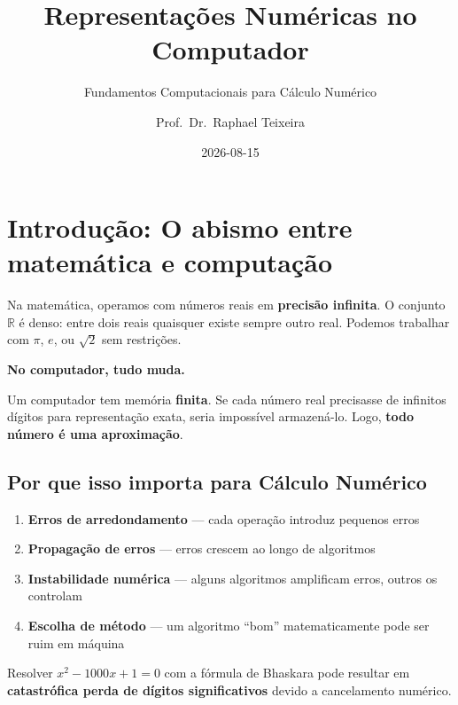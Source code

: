 \documentclass[
  11pt,
  letterpaper,
  DIV=11,
  numbers=noendperiod]{scrartcl}
\title{Representações Numéricas no Computador}
\subtitle{Fundamentos Computacionais para Cálculo Numérico}
\author{Prof.~Dr.~Raphael Teixeira}
\date{2026-08-15}
\providecommand{\tightlist}{%
  \setlength{\itemsep}{0pt}\setlength{\parskip}{0pt}}
\renewcommand*\contentsname{Table of contents}
\newcommand\contentsname{Table of contents}
\begin{document}
\maketitle

\renewcommand*\contentsname{Table of contents}
{
\setcounter{tocdepth}{3}
\tableofcontents
}

\section{Introdução: O abismo entre matemática e
computação}\label{introduuxe7uxe3o-o-abismo-entre-matemuxe1tica-e-computauxe7uxe3o}

Na matemática, operamos com números reais em \textbf{precisão infinita}.
O conjunto \(\mathbb{R}\) é denso: entre dois reais quaisquer existe
sempre outro real. Podemos trabalhar com \(\pi\), \(e\), ou \(\sqrt{2}\)
sem restrições.

\textbf{No computador, tudo muda.}

Um computador tem memória \textbf{finita}. Se cada número real
precisasse de infinitos dígitos para representação exata, seria
impossível armazená-lo. Logo, \textbf{todo número é uma aproximação}.

\subsection{Por que isso importa para Cálculo
Numérico}\label{por-que-isso-importa-para-cuxe1lculo-numuxe9rico}

\begin{enumerate}
\def\labelenumi{\arabic{enumi}.}
\tightlist
\item
  \textbf{Erros de arredondamento} --- cada operação introduz pequenos
  erros
\item
  \textbf{Propagação de erros} --- erros crescem ao longo de
  algoritmos\\
\item
  \textbf{Instabilidade numérica} --- alguns algoritmos amplificam
  erros, outros os controlam
\item
  \textbf{Escolha de método} --- um algoritmo ``bom'' matematicamente
  pode ser ruim em máquina
\end{enumerate}

\begin{tcolorbox}[enhanced jigsaw, arc=.35mm, bottomrule=.15mm, bottomtitle=1mm, breakable, colback=white, colbacktitle=quarto-callout-warning-color!10!white, colframe=quarto-callout-warning-color-frame, coltitle=black, left=2mm, leftrule=.75mm, opacityback=0, opacitybacktitle=0.6, rightrule=.15mm, title=\textcolor{quarto-callout-warning-color}{\faExclamationTriangle}\hspace{0.5em}{Exemplo clássico}, titlerule=0mm, toprule=.15mm, toptitle=1mm]

Resolver \(x^2 - 1000x + 1 = 0\) com a fórmula de Bhaskara pode resultar
em \textbf{catastrófica perda de dígitos significativos} devido a
cancelamento numérico.

\end{tcolorbox}
\end{document}
